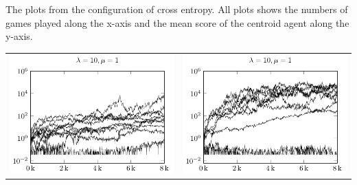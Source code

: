 The plots from the configuration of cross entropy.
All plots shows the numbers of games played along the x-axis
and the mean score of the centroid agent along the y-axis.

\begin{tabular}{@{}l@{}l@{}}
\includegraphics[scale=1]{plots/ce_ConstantNoise_l10_o1_all} &
\includegraphics[scale=1]{plots/ce_ConstantNoise_l10_o5_all}
\end{tabular}

